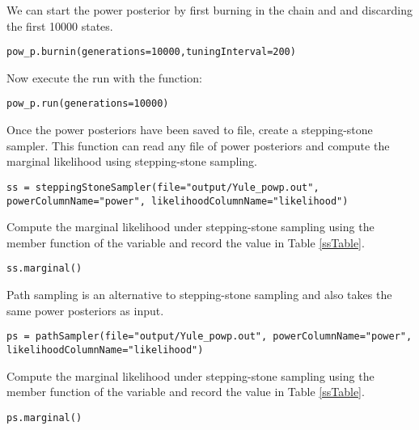 We can start the power posterior by first burning in the chain and and discarding the first 10000 states.
{\tt \begin{snugshade*}
\begin{lstlisting}
pow_p.burnin(generations=10000,tuningInterval=200)
\end{lstlisting}
\end{snugshade*}}

Now execute the run with the  function:
{\tt \begin{snugshade*}
\begin{lstlisting}
pow_p.run(generations=10000)
\end{lstlisting}
\end{snugshade*}}

Once the power posteriors have been saved to file, create a stepping-stone sampler.
This function can read any file of power posteriors and compute the marginal likelihood using stepping-stone sampling.
{\tt \small \begin{snugshade*}
\begin{lstlisting}
ss = steppingStoneSampler(file="output/Yule_powp.out", powerColumnName="power", likelihoodColumnName="likelihood")
\end{lstlisting}
\end{snugshade*}}

Compute the marginal likelihood under stepping-stone sampling using the member function  of the  variable and record the value in Table \ref{ssTable}.
{\tt \begin{snugshade*}
\begin{lstlisting}
ss.marginal()
\end{lstlisting}
\end{snugshade*}}

Path sampling is an alternative to stepping-stone sampling and also takes the same power posteriors as input.
{\tt \small \begin{snugshade*}
\begin{lstlisting}
ps = pathSampler(file="output/Yule_powp.out", powerColumnName="power", likelihoodColumnName="likelihood")
\end{lstlisting}
\end{snugshade*}}

Compute the marginal likelihood under stepping-stone sampling using the member function  of the  variable and record the value in Table \ref{ssTable}.
{\tt \begin{snugshade*}
\begin{lstlisting}
ps.marginal()
\end{lstlisting}
\end{snugshade*}}


